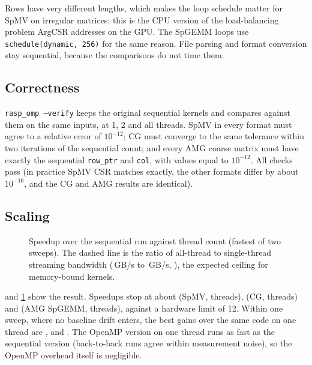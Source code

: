 Rows have very different lengths, which makes the loop schedule matter for SpMV on irregular matrices: this is the
CPU version of the load-balancing problem ArgCSR addresses on the GPU. The SpGEMM loops use
\texttt{schedule(dynamic, 256)} for the same reason. File parsing and format conversion stay sequential, because
the comparisons do not time them.

\subsection{Correctness}
\texttt{rasp\_omp --verify} keeps the original sequential kernels and compares against them on the same inputs, at
1, 2 and all threads. SpMV in every format must agree to a relative error of $10^{-12}$; CG must converge to the
same tolerance within two iterations of the sequential count; and every AMG coarse matrix must have exactly the
sequential \texttt{row\_ptr} and \texttt{col}, with values equal to $10^{-12}$. All checks pass (in practice SpMV
CSR matches exactly, the other formats differ by about $10^{-16}$, and the CG and AMG results are identical).

\subsection{Scaling}
\begin{figure}[t]
\centering{}
\caption{Speedup over the sequential run against thread count (fastest of two sweeps). The dashed line is the
ratio of all-thread to single-thread streaming bandwidth (\,GB/s to \,GB/s,
\x), the expected ceiling for memory-bound kernels.}\label{fig:omp-scaling}
\end{figure}

\begin{table}[t]
\centering\small
\caption{Speedup over the sequential version on the same machine (fastest of two sweeps). SpMV is the geometric
mean over six matrices; CG solves a $128^3$ Laplacian; AMG is the SpGEMM time of a $160^3$ Laplace hierarchy.}\label{tab:omp-scaling}
\end{table}

 and \cref{fig:omp-scaling} show the result. Speedups stop at about \x{} (SpMV, 
threads), \x{} (CG,  threads) and \x{} (AMG SpGEMM,
 threads), against a hardware limit of 12. Within one sweep, where no baseline drift enters, the
best gains over the same code on one thread are \x, \x{} and
\x. The OpenMP version on one thread runs as fast as the sequential version (back-to-back runs agree
within measurement noise), so the OpenMP overhead itself is negligible.


